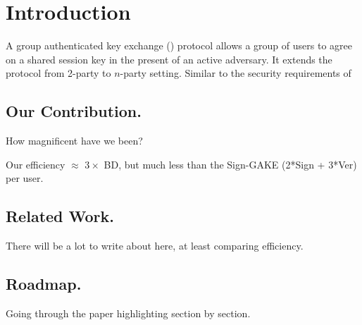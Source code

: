 \newcommand{\introGAKE}{\text{GAKE}\xspace}
\newcommand{\introAKE}{\text{AKE}\xspace}


\section{Introduction}\label{sec:introduction}
A group authenticated key exchange (\introGAKE) protocol allows a group of users to agree on a shared session key in the present of an active adversary. It extends the \introAKE protocol from 2-party to $n$-party setting. Similar to the security requirements of 

\subsection{Our Contribution.}
How magnificent have we been?

Our efficiency $\approx$ $3\times $ BD, but much less than the Sign-GAKE (2*Sign + 3*Ver) per user.

\subsection{Related Work.}
There will be a lot to write about here, at least comparing efficiency.

\subsection{Roadmap.}
Going through the paper highlighting section by section.
